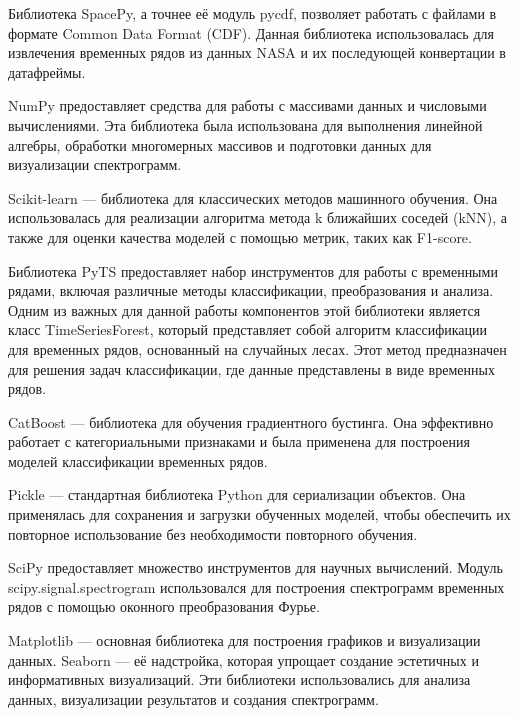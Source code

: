 \documentclass[spec, och, diploma]{SCWorks}
\begin{document}
        Библиотека SpacePy, а точнее её модуль pycdf, позволяет работать с
        файлами в формате Common Data Format (CDF). Данная библиотека
        использовалась для извлечения временных рядов из данных NASA и их
        последующей конвертации в датафреймы. \cite{fwspacepy}

        NumPy предоставляет средства для работы с массивами данных и числовыми
        вычислениями. Эта библиотека была использована для выполнения линейной
        алгебры, обработки многомерных массивов и подготовки данных для
        визуализации спектрограмм. \cite{fwnumpy}

        Scikit-learn — библиотека для классических методов машинного обучения.
        Она использовалась для реализации алгоритма метода k ближайших соседей
        (kNN), а также для оценки качества моделей с помощью метрик, таких как
        F1-score. \cite{fwsl}
        
        Библиотека PyTS предоставляет набор инструментов для работы с временными
        рядами, включая различные методы классификации, преобразования и
        анализа. Одним из важных для данной работы компонентов этой библиотеки
        является класс TimeSeriesForest, который представляет собой алгоритм
        классификации для временных рядов, основанный на случайных лесах. Этот
        метод предназначен для решения задач классификации, где данные
        представлены в виде временных рядов. \cite{fwpyts}
        
        CatBoost — библиотека для обучения градиентного бустинга. Она эффективно
        работает с категориальными признаками и была применена для построения
        моделей классификации временных рядов. \cite{fwcatboost}

        Pickle — стандартная библиотека Python для сериализации объектов. Она
        применялась для сохранения и загрузки обученных моделей, чтобы
        обеспечить их повторное использование без необходимости повторного
        обучения. \cite{fwpickle}

        SciPy предоставляет множество инструментов для научных вычислений.
        Модуль scipy.signal.spectrogram использовался для построения
        спектрограмм временных рядов с помощью оконного преобразования Фурье.
        \cite{fwscipy}
        
        Matplotlib — основная библиотека для построения графиков и визуализации
        данных. Seaborn — её надстройка, которая упрощает создание эстетичных и
        информативных визуализаций. \cite{fwmatplotlib} Эти библиотеки
        использовались для анализа данных, визуализации результатов и создания
        спектрограмм. \cite{fwseaborn}
\end{document}
